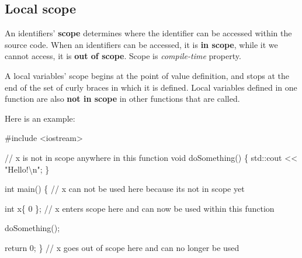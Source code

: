 \documentclass[
  letterpaper,
  DIV=11,
  numbers=noendperiod]{scrreprt}
\newenvironment{Shaded}{\begin{snugshade}}{\end{snugshade}}
\newcommand{\CommentTok}[1]{\textcolor[rgb]{0.37,0.37,0.37}{#1}}
\newcommand{\ControlFlowTok}[1]{\textcolor[rgb]{0.00,0.23,0.31}{#1}}
\newcommand{\ErrorTok}[1]{\textcolor[rgb]{0.68,0.00,0.00}{#1}}
\newcommand{\FunctionTok}[1]{\textcolor[rgb]{0.28,0.35,0.67}{#1}}
\newcommand{\NormalTok}[1]{\textcolor[rgb]{0.00,0.23,0.31}{#1}}
\newcommand{\SpecialCharTok}[1]{\textcolor[rgb]{0.37,0.37,0.37}{#1}}
\newcommand{\StringTok}[1]{\textcolor[rgb]{0.13,0.47,0.30}{#1}}
\begin{document}
\hypertarget{local-scope}{%
\subsection{Local scope}\label{local-scope}}

An identifiers' \textbf{scope} determines where the identifier can be
accessed within the source code. When an identifiers can be accessed, it
is \textbf{in scope}, while it we cannot access, it is \textbf{out of
scope}. Scope is \emph{compile-time} property.

A local variables' scope begins at the point of value definition, and
stops at the end of the set of curly braces in which it is defined.
Local variables defined in one function are also \textbf{not in scope}
in other functions that are called.

Here is an example:

\begin{Shaded}
\begin{Highlighting}[]
\CommentTok{\#include \textless{}iostream\textgreater{}}

\SpecialCharTok{/}\ErrorTok{/}\NormalTok{ x is not }\ControlFlowTok{in}\NormalTok{ scope anywhere }\ControlFlowTok{in}\NormalTok{ this }\ControlFlowTok{function}
\NormalTok{void }\FunctionTok{doSomething}\NormalTok{()}
\NormalTok{\{}
\NormalTok{    std}\SpecialCharTok{::}\NormalTok{cout }\SpecialCharTok{\textless{}}\ErrorTok{\textless{}} \StringTok{"Hello!}\SpecialCharTok{\textbackslash{}n}\StringTok{"}\NormalTok{;}
\NormalTok{\}}

\NormalTok{int }\FunctionTok{main}\NormalTok{()}
\NormalTok{\{}
    \SpecialCharTok{/}\ErrorTok{/}\NormalTok{ x can not be used here because it}\StringTok{\textquotesingle{}s not in scope yet}

\StringTok{    int x\{ 0 \}; // x enters scope here and can now be used within this function}

\StringTok{    doSomething();}

\StringTok{    return 0;}
\StringTok{\} // x goes out of scope here and can no longer be used}
\end{Highlighting}
\end{Shaded}
\end{document}
